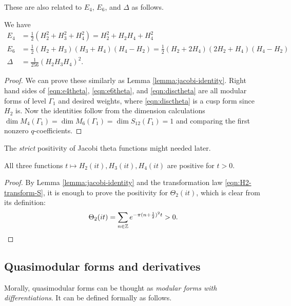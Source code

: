 These are also related to $E_4$, $E_6$, and $\Delta$ as follows.
\begin{lemma}\label{lemma:lv1-lv2-identities}
We have
\begin{align}
    E_4 &= \frac{1}{2}(H_{2}^{2} + H_{3}^{2} + H_{4}^{2}) = H_{2}^{2} + H_{2}H_{4} + H_{4}^{2} \label{eqn:e4theta} \\
    E_6 &= \frac{1}{2} (H_{2} + H_{3})(H_{3} + H_{4}) (H_{4} - H_{2}) = \frac{1}{2}(H_2 + 2H_4)(2H_2 + H_4)(H_4 - H_2) \label{eqn:e6theta} \\
    \Delta &= \frac{1}{256} (H_{2}H_{3}H_{4})^2. \label{eqn:disctheta}
\end{align}
\end{lemma}
\begin{proof}
We can prove these similarly as Lemma \ref{lemma:jacobi-identity}.
Right hand sides of \eqref{eqn:e4theta}, \eqref{eqn:e6theta}, and \eqref{eqn:disctheta} are all modular forms of level $\Gamma_1$ and desired weights, where \eqref{eqn:disctheta} is a cusp form since $H_2$ is.
Now the identities follow from the dimension calculations $\dim M_4(\Gamma_1) = \dim M_6(\Gamma_1) = \dim S_{12}(\Gamma_1) = 1$ and comparing the first nonzero $q$-coefficients.
\end{proof}

The \emph{strict} positivity of Jacobi theta functions might needed later.
\begin{lemma}\label{lemma:theta-pos}
All three functions $t \mapsto H_2(it), H_3(it), H_4(it)$ are positive for $t > 0$.
\end{lemma}
\begin{proof}
By Lemma \ref{lemma:jacobi-identity} and the transformation law \eqref{eqn:H2-transform-S}, it is enough to prove the positivity for $\Theta_2(it)$, which is clear from its definition:
\begin{equation}
    \Theta_{2}(it) = \sum_{n \in \mathbb{Z}} e^{- \pi (n + \frac{1}{2})^{2} t} > 0.
\end{equation}
\end{proof}

\subsection{Quasimodular forms and derivatives}

Morally, quasimodular forms can be thought as \emph{modular forms with differentiations}.
It can be defined formally as follows.

